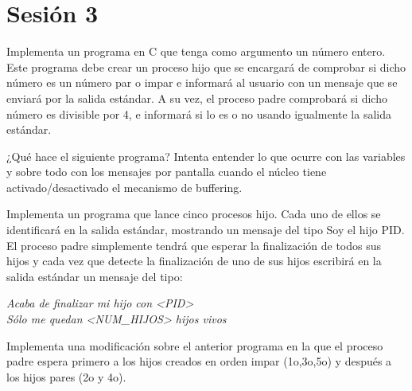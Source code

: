 \chapter{Sesión 3}

\begin{exercise}
Implementa un programa en C que tenga como argumento un número entero.
Este programa debe crear un proceso hijo que se encargará de comprobar si dicho número es
un número par o impar e informará al usuario con un mensaje que se enviará por la salida
estándar. A su vez, el proceso padre comprobará si dicho número es divisible por 4, e
informará si lo es o no usando igualmente la salida estándar.
\end{exercise}
\begin{exercise}
¿Qué hace el siguiente programa? Intenta entender lo que ocurre con las
variables y sobre todo con los mensajes por pantalla cuando el núcleo tiene
activado/desactivado el mecanismo de buffering.
\end{exercise}

\begin{exercise}
Implementa un programa que lance cinco procesos hijo. Cada uno de ellos se
identificará en la salida estándar, mostrando un mensaje del tipo Soy el hijo PID. El
proceso padre simplemente tendrá que esperar la finalización de todos sus hijos y cada vez
que detecte la finalización de uno de sus hijos escribirá en la salida estándar un mensaje del
tipo:

\emph{Acaba de finalizar mi hijo con <PID>}\\
\emph{Sólo me quedan <NUM_HIJOS> hijos vivos}
\end{exercise}

\begin{exercise}
Implementa una modificación sobre el anterior programa en la que el proceso
padre espera primero a los hijos creados en orden impar (1o,3o,5o) y después a los hijos pares
(2o y 4o).
\end{exercise}

